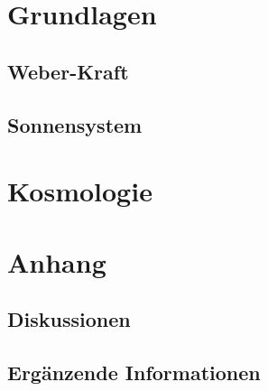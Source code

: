 \documentclass{book}
\numberwithin{equation}{section}
\begin{document}
\part{Grundlagen}
\chapter{Weber-Kraft}





\chapter{Sonnensystem}



\part{Kosmologie}


\part{Anhang}
\chapter{Diskussionen}


\chapter{Ergänzende Informationen}

\end{document}
